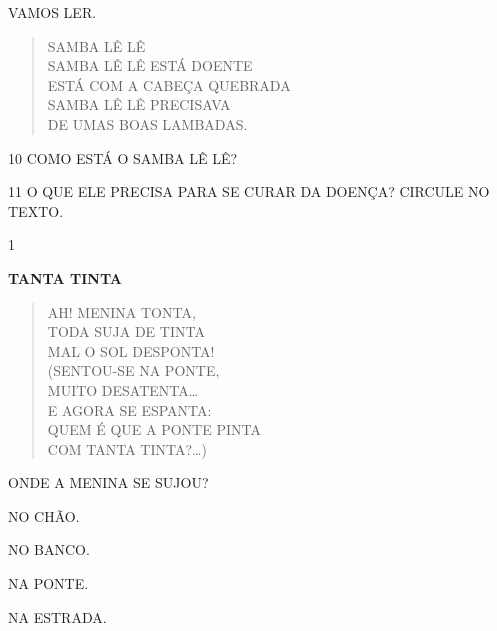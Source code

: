 \begin{escola}
VAMOS LER.

\begin{verse}
SAMBA LÊ LÊ\\
SAMBA LÊ LÊ ESTÁ DOENTE\\
ESTÁ COM A CABEÇA QUEBRADA\\
SAMBA LÊ LÊ PRECISAVA\\
DE UMAS BOAS LAMBADAS.
\end{verse}


\num{10} COMO ESTÁ O SAMBA LÊ LÊ?


\num{11} O QUE ELE PRECISA PARA SE CURAR DA DOENÇA? CIRCULE NO TEXTO.



\num{1}

\textbf{TANTA TINTA}

\begin{verse}
AH! MENINA TONTA,\\
TODA SUJA DE TINTA\\
MAL O SOL DESPONTA!\\
(SENTOU-SE NA PONTE,\\
MUITO DESATENTA\ldots{}\\
E AGORA SE ESPANTA:\\
QUEM É QUE A PONTE PINTA\\
COM TANTA TINTA?\ldots{})
\end{verse}


ONDE A MENINA SE SUJOU?

\begin{escolha}
\item NO CHÃO.

\item NO BANCO.

\item NA PONTE.

\item NA ESTRADA.
\end{escolha}



\end{escola}

